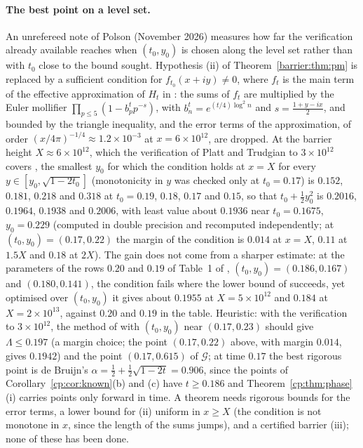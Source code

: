 \paragraph{The best point on a level set.} An unrefereed note of Polson (November 2026) measures how far the verification already available reaches when $(t_0,y_0)$ is chosen along the level set rather than with $t_0$ close to the bound sought. Hypothesis (ii) of Theorem~\ref{barrier:thm:pm} is replaced by a sufficient condition for $f_{t_0}(x+iy)\ne0$, where $f_t$ is the main term of the effective approximation of $H_t$ in \cite{Polymath}: the sums of $f_t$ are multiplied by the Euler mollifier $\prod_{p\le5}(1-b_p^tp^{-s})$, with $b_n^t=e^{(t/4)\log^2n}$ and $s=\frac{1+y-ix}2$, and bounded by the triangle inequality, and the error terms of the approximation, of order $(x/4\pi)^{-1/4}\approx1.2\times10^{-3}$ at $x=6\times10^{12}$, are dropped. At the barrier height $X\approx6\times10^{12}$, which the verification of Platt and Trudgian to $3\times10^{12}$ covers \cite{PT21}, the smallest $y_0$ for which the condition holds at $x=X$ for every $y\in[y_0,\sqrt{1-2t_0}]$ (monotonicity in $y$ was checked only at $t_0=0.17$) is $0.152$, $0.181$, $0.218$ and $0.318$ at $t_0=0.19$, $0.18$, $0.17$ and $0.15$, so that $t_0+\frac12y_0^2$ is $0.2016$, $0.1964$, $0.1938$ and $0.2006$, with least value about $0.1936$ near $t_0=0.1675$, $y_0=0.229$ (computed in double precision and recomputed independently; at $(t_0,y_0)=(0.17,0.22)$ the margin of the condition is $0.014$ at $x=X$, $0.11$ at $1.5X$ and $0.18$ at $2X$). The gain does not come from a sharper estimate: at the parameters of the rows $0.20$ and $0.19$ of Table~1 of \cite{Polymath}, $(t_0,y_0)=(0.186,0.167)$ and $(0.180,0.141)$, the condition fails where the lower bound of \cite{Polymath} succeeds, yet optimised over $(t_0,y_0)$ it gives about $0.1955$ at $X=5\times10^{12}$ and $0.184$ at $X=2\times10^{13}$, against $0.20$ and $0.19$ in the table. Heuristic: with the verification to $3\times10^{12}$, the method of \cite{Polymath} with $(t_0,y_0)$ near $(0.17,0.23)$ should give $\Lambda\le0.197$ (a margin choice; the point $(0.17,0.22)$ above, with margin $0.014$, gives $0.1942$) and the point $(0.17,0.615)$ of $\mathcal G$; at time $0.17$ the best rigorous point is de Bruijn's $\alpha=\frac12+\frac12\sqrt{1-2t}=0.906$, since the points of Corollary~\ref{cp:cor:known}(b) and (c) have $t\ge0.186$ and Theorem~\ref{cp:thm:phase}(i) carries points only forward in time. A theorem needs rigorous bounds for the error terms, a lower bound for (ii) uniform in $x\ge X$ (the condition is not monotone in $x$, since the length of the sums jumps), and a certified barrier (iii); none of these has been done.


